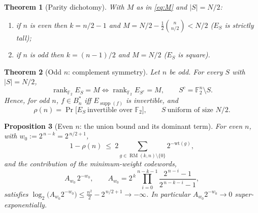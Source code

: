 \documentclass{amsart}
\newtheorem{theorem}{Theorem}
\newtheorem{proposition}[theorem]{Proposition}
\theoremstyle{definition}
\DeclareMathOperator{\supp}{supp}
\DeclareMathOperator{\RM}{RM}
\DeclareMathOperator{\rank}{rank}
\newcommand{\F}{\mathbb{F}}
\begin{document}
\begin{theorem}[Parity dichotomy]\label{thm:dichotomy}
With $M$ as in \eqref{eq:M} and $|S|=N/2$:
\begin{enumerate}
\item if $n$ is even then $k=n/2-1$ and $M=N/2-\tfrac12\binom n{n/2}<N/2$
      ($E_S$ is strictly tall);
\item if $n$ is odd then $k=(n-1)/2$ and $M=N/2$ ($E_S$ is square).
\end{enumerate}
\end{theorem}

\begin{theorem}[Odd $n$: complement symmetry]\label{thm:odd-sym}
Let $n$ be odd. For every $S$ with $|S|=N/2$,
\[
\rank_{\F_2}E_S=M\iff \rank_{\F_2}E_{S^c}=M,\qquad S^c=\F_2^n\setminus S.
\]
Hence, for odd $n$, $f\in B_n^*$ iff $E_{\supp(f)}$ is invertible, and
\begin{equation}\label{eq:odd-rho}
\rho(n)=\Pr\bigl[E_{S}\ \text{invertible over }\F_2\bigr],\qquad
S\ \text{uniform of size }N/2 .
\end{equation}
\end{theorem}

\begin{proposition}[Even $n$: the union bound and its dominant term]
\label{prop:evenmin}
For even $n$, with $w_0:=2^{\,n-k}=2^{\,n/2+1}$,
\begin{equation}\label{eq:even-bound}
1-\rho(n)\ \le\ 2\sum_{g\in\RM(k,n)\setminus\{0\}}2^{-\mathrm{wt}(g)},
\end{equation}
and the contribution of the minimum-weight codewords,
\[
A_{w_0}\,2^{-w_0},\qquad
A_{w_0}=2^{\,k}\prod_{i=0}^{n-k-1}\frac{2^{\,n-i}-1}{2^{\,n-k-i}-1},
\]
satisfies $\log_2\bigl(A_{w_0}2^{-w_0}\bigr)\le \tfrac{n^2}{2}-2^{\,n/2+1}
\to-\infty$. In particular $A_{w_0}2^{-w_0}\to0$ super-exponentially.
\end{proposition}
\end{document}
